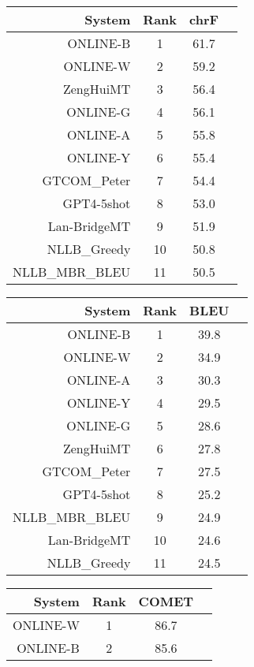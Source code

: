 \documentclass[11pt]{article}
\begin{document}
\begin{table}  
\scriptsize\begin{subtable}[t]{0.33\textwidth}
\begin{tabular}{rccc}
\toprule 
System & Rank & chrF \\ 
\midrule 
ONLINE-B & 1 & 61.7 \\ 
ONLINE-W & 2 & 59.2 \\ 
ZengHuiMT & 3 & 56.4 \\ 
ONLINE-G & 4 & 56.1 \\ 
ONLINE-A & 5 & 55.8 \\ 
ONLINE-Y & 6 & 55.4 \\ 
GTCOM\_Peter & 7 & 54.4 \\ 
GPT4-5shot & 8 & 53.0 \\ 
Lan-BridgeMT & 9 & 51.9 \\ 
NLLB\_Greedy & 10 & 50.8 \\ 
NLLB\_MBR\_BLEU & 11 & 50.5 \\ 
\bottomrule 
\end{tabular} 
\end{subtable} 
\begin{subtable}[t]{0.33\textwidth}
\begin{tabular}{rccc}
\toprule 
System & Rank & BLEU \\ 
\midrule 
ONLINE-B & 1 & 39.8 \\ 
ONLINE-W & 2 & 34.9 \\ 
ONLINE-A & 3 & 30.3 \\ 
ONLINE-Y & 4 & 29.5 \\ 
ONLINE-G & 5 & 28.6 \\ 
ZengHuiMT & 6 & 27.8 \\ 
GTCOM\_Peter & 7 & 27.5 \\ 
GPT4-5shot & 8 & 25.2 \\ 
NLLB\_MBR\_BLEU & 9 & 24.9 \\ 
Lan-BridgeMT & 10 & 24.6 \\ 
NLLB\_Greedy & 11 & 24.5 \\ 
\bottomrule 
\end{tabular} 
\end{subtable} 
\begin{subtable}[t]{0.33\textwidth}
\begin{tabular}{rccc}
\toprule 
System & Rank & COMET \\ 
\midrule 
ONLINE-W & 1 & 86.7 \\ 
ONLINE-B & 2 & 85.6 \\ 

\end{tabular}
\end{subtable}
\end{table}
\end{document}
